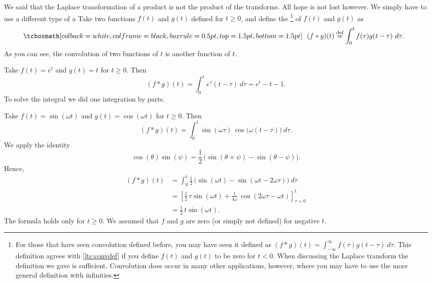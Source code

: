 We said that the Laplace transformation of a product is not the product
of the transforms.  All hope is not lost however.  We simply have to use
a different type of a 
Take
two functions $f(t)$ and $g(t)$ defined for $t \geq 0$,
and define the \emph{}%
\footnote{%
For those that have seen convolution defined before, you may have
seen it defined as
$(f * g)(t) =
\int_{-\infty}^\infty f(\tau) g(t-\tau) ~ d\tau$.  This definition
agrees with \eqref{ltc:convdef} if you define $f(t)$ and $g(t)$
to be zero for $t < 0$.
When discussing the Laplace transform the definition we gave is
sufficient.  Convolution does occur in many other applications, however,
where you may have to use the more general definition with infinities.
}
of $f(t)$ and $g(t)$ as
\begin{equation} \label{ltc:convdef}
\mybxbg{~~
(f * g)(t) \overset{\text{def}}{=}
\int_0^t f(\tau) g(t-\tau) ~ d\tau .
~~}
\end{equation}
As you can see, the convolution of two functions of $t$ is another function of $t$.


\begin{example}
Take $f(t) = e^t$ and $g(t) = t$ for $t \geq 0$.  Then 
\begin{equation*}
(f*g)(t)
=
\int_0^t e^\tau (t-\tau) ~ d\tau
=
e^t - t - 1 .
\end{equation*}
To solve the integral we
did one integration by parts.
\end{example}

\begin{example} \label{ltc:convsincosex}
Take $f(t) = \sin (\omega t)$ and $g(t) = \cos (\omega t)$ for $t \geq 0$.
Then 
\begin{equation*}
(f*g)(t)
=
\int_0^t  \sin ( \omega \tau ) \,
\cos \bigl( \omega (t-\tau) \bigr) ~ d\tau .
\end{equation*}
We apply the identity
\begin{equation*}
\cos (\theta) \sin (\psi) =
\frac{1}{2} \, \bigl( \sin (\theta + \psi) - \sin (\theta - \psi) \bigr) .
\end{equation*}
Hence,
\begin{equation*}
\begin{split}
(f*g)(t)
& =
\int_0^t
\frac{1}{2} \, \bigl( \sin (\omega t) - \sin (\omega t - 2 \omega \tau
) \bigr) ~ d\tau
\\
& =
\left[ \frac{1}{2} \, \tau  \sin (\omega t) + \frac{1}{4\omega} \, \cos (2 \omega \tau -
\omega t) \right]_{\tau=0}^t
\\
& = \frac{1}{2} \, t \sin (\omega t) .
\end{split}
\end{equation*}
The formula holds only for $t \geq 0$.  We assumed that $f$
and $g$ are zero (or simply not defined) for negative $t$.
\end{example}

